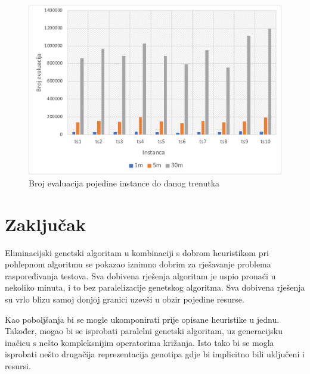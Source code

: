\documentclass[utf8, seminar, numeric]{fer}
\begin{document}
\begin{figure}[H]
	\centering
	\includegraphics[width=1.0\textwidth]{evals.pdf}
	\caption{Broj evaluacija pojedine instance do danog trenutka}
	\label{fig:evals}
\end{figure}
 
\chapter{Zaključak}

Eliminacijski genetski algoritam u kombinaciji s dobrom heuristikom pri pohlepnom algoritmu se pokazao iznimno dobrim za rješavanje problema raspoređivanja testova. Sva dobivena rješenja algoritam je uspio pronaći u nekoliko minuta, i to bez paralelizacije genetskog algoritma. Sva dobivena rješenja su vrlo blizu samoj donjoj granici uzevši u obzir pojedine resurse.

Kao poboljšanja bi se mogle ukomponirati prije opisane heuristike u jednu. Također, mogao bi se isprobati paralelni genetski algoritam, uz generacijsku inačicu s nešto kompleksnijim operatorima križanja. Isto tako bi se mogla isprobati nešto drugačija reprezentacija genotipa gdje bi implicitno bili uključeni i resursi.



\end{document}
